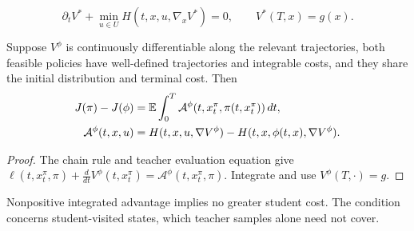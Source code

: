 \begin{equation}
 \partial_t V^*+\min_{u\in U}H(t,x,u,\nabla_xV^*)=0,
 \qquad V^*(T,x)=g(x).
\end{equation}
\begin{proposition}
Suppose $V^\phi$ is continuously differentiable along the relevant
trajectories, both feasible policies have well-defined trajectories and
integrable costs, and they share the initial distribution and terminal
cost. Then
\begin{align}
 J(\pi)-J(\phi)&=\mathbb E\int_0^T
 \mathcal A^\phi(t,x_t^\pi,\pi(t,x_t^\pi))\,dt,\\
 \mathcal A^\phi(t,x,u)&=H(t,x,u,\nabla V^\phi)
                  -H(t,x,\phi(t,x),\nabla V^\phi).
\end{align}
\end{proposition}
\begin{proof}
The chain rule and teacher evaluation equation give
$\ell(t,x_t^\pi,\pi)+\frac{d}{dt}V^\phi(t,x_t^\pi)
=\mathcal A^\phi(t,x_t^\pi,\pi)$. Integrate and use
$V^\phi(T,\cdot)=g$.
\end{proof}
Nonpositive integrated advantage implies no greater student cost. The
condition concerns student-visited states, which teacher samples alone
need not cover.
